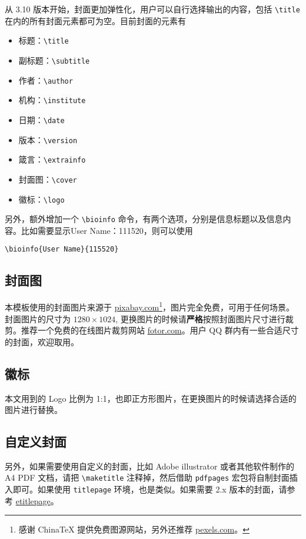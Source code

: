 \documentclass[cn,11pt]{elegantbook}
\begin{document}
从 3.10 版本开始，封面更加弹性化，用户可以自行选择输出的内容，包括 \lstinline{\title} 在内的所有封面元素都可为空。目前封面的元素有
\begin{itemize}
  \item 标题：\lstinline{\title}
  \item 副标题：\lstinline{\subtitle}
  \item 作者：\lstinline{\author}
  \item 机构：\lstinline{\institute}
  \item 日期：\lstinline{\date}
  \item 版本：\lstinline{\version}
  \item 箴言：\lstinline{\extrainfo}
  \item 封面图：\lstinline{\cover}
  \item 徽标：\lstinline{\logo}
\end{itemize}

另外，额外增加一个 \lstinline{\bioinfo} 命令，有两个选项，分别是信息标题以及信息内容。比如需要显示{\kaishu User Name：111520}，则可以使用 
\begin{lstlisting}
\bioinfo{User Name}{115520}
\end{lstlisting}

\subsection{封面图}

本模板使用的封面图片来源于 \href{https://pixabay.com/en/tea-time-poetry-coffee-reading-3240766/}{pixabay.com}\footnote{感谢 China\TeX{} 提供免费图源网站，另外还推荐 \href{https://www.pexels.com/}{pexels.com}。}，图片完全免费，可用于任何场景。封面图片的尺寸为 $1280 \times 1024$, 更换图片的时候请\textbf{严格}按照封面图片尺寸进行裁剪。推荐一个免费的在线图片裁剪网站 \href{https://www.fotor.com/cn}{fotor.com}。用户 QQ 群内有一些合适尺寸的封面，欢迎取用。

\subsection{徽标}

本文用到的 Logo 比例为 1:1，也即正方形图片，在更换图片的时候请选择合适的图片进行替换。

\subsection{自定义封面}

另外，如果需要使用自定义的封面，比如 Adobe illustrator 或者其他软件制作的 A4 PDF 文档，请把 \lstinline{\maketitle} 注释掉，然后借助 \lstinline{pdfpages} 宏包将自制封面插入即可。如果使用 \lstinline{titlepage} 环境，也是类似。如果需要 2.x 版本的封面，请参考 \href{https://github.com/EthanDeng/etitlepage}{etitlepage}。
\end{document}
